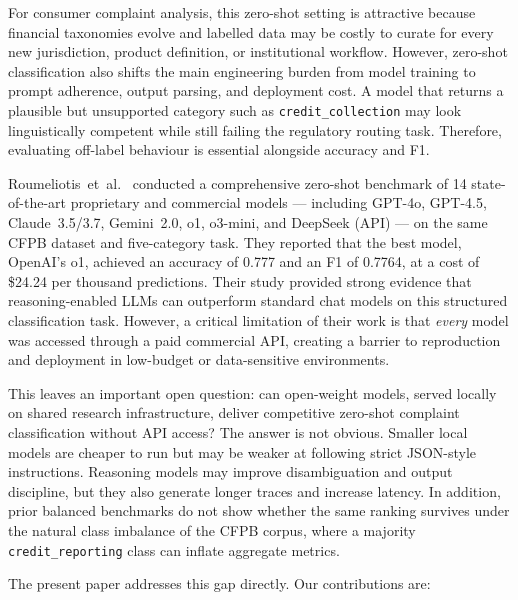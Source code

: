 \documentclass[10pt,a4paper,twocolumn]{article}
\begin{document}
For consumer complaint analysis, this zero-shot setting is attractive
because financial taxonomies evolve and labelled data may be costly to
curate for every new jurisdiction, product definition, or institutional
workflow. However, zero-shot classification also shifts the main
engineering burden from model training to prompt adherence, output
parsing, and deployment cost. A model that returns a plausible but
unsupported category such as \texttt{credit\_collection} may look
linguistically competent while still failing the regulatory routing
task. Therefore, evaluating off-label behaviour is essential alongside
accuracy and F1.

Roumeliotis~et~al.\ \cite{roumeliotis2025think} conducted a
comprehensive zero-shot benchmark of 14 state-of-the-art proprietary
and commercial models --- including GPT-4o, GPT-4.5, Claude~3.5/3.7,
Gemini~2.0, o1, o3-mini, and DeepSeek (API) --- on the same CFPB
dataset and five-category task. They reported that the best model,
OpenAI's o1, achieved an accuracy of 0.777 and an F1 of 0.7764, at a
cost of \$24.24 per thousand predictions. Their study provided strong
evidence that reasoning-enabled LLMs can outperform standard chat
models on this structured classification task. However, a critical
limitation of their work is that \emph{every} model was accessed
through a paid commercial API, creating a barrier to reproduction
and deployment in low-budget or data-sensitive environments.

This leaves an important open question: can open-weight models, served
locally on shared research infrastructure, deliver competitive
zero-shot complaint classification without API access? The answer is
not obvious. Smaller local models are cheaper to run but may be weaker
at following strict JSON-style instructions. Reasoning models may
improve disambiguation and output discipline, but they also generate
longer traces and increase latency. In addition, prior balanced
benchmarks do not show whether the same ranking survives under the
natural class imbalance of the CFPB corpus, where a majority
\texttt{credit\_reporting} class can inflate aggregate metrics.

The present paper addresses this gap directly. Our contributions are:
\end{document}
